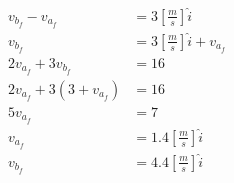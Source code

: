 \documentclass{article}
\begin{document}
\begin{enumerate}
\begin{enumerate}
\begin{align*}
                \end{align*}
                \begin{align*}
                    v_{b_f}-v_{a_f}&=3[\frac{m}{s}]\hat{i} \\
                    v_{b_f}&=3[\frac{m}{s}]\hat{i} + v_{a_f} \\
                    2v_{a_f} + 3v_{b_f}&=16 \\
                    2v_{a_f} + 3(3+v_{a_f})&=16 \\
                    5v_{a_f}&=7 \\
                    v_{a_f}&=1.4[\frac{m}{s}]\hat{i} \\
                    v_{b_f}&=4.4[\frac{m}{s}]\hat{i} \\\\\\
                \end{align*}
            \end{enumerate}
        \end{enumerate}
\end{document}
